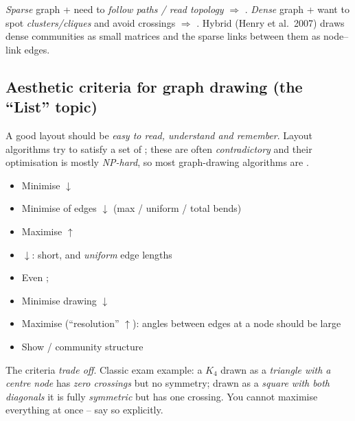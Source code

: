 \begin{keybox}
\emph{Sparse} graph + need to \emph{follow paths / read topology} $\Rightarrow$
. \emph{Dense} graph + want to spot \emph{clusters/cliques} and
avoid crossings $\Rightarrow$ . Hybrid  (Henry et
al.\ 2007) draws dense communities as small matrices and the sparse links
between them as node--link edges.
\end{keybox}

\subsection{Aesthetic criteria for graph drawing (the ``List'' topic)}

A good layout should be \emph{easy to read, understand and remember}. Layout
algorithms try to satisfy a set of ; these are often
\emph{contradictory} and their optimisation is mostly \emph{NP-hard}, so most
graph-drawing algorithms are .

\begin{keybox}
\begin{itemize}[leftmargin=1.4em]
  \item Minimise  $\downarrow$
  \item Minimise  of edges $\downarrow$ (max / uniform / total bends)
  \item Maximise  $\uparrow$
  \item {} $\downarrow$: short, and \emph{uniform} edge lengths
  \item Even ; 
  \item Minimise drawing  $\downarrow$
  \item Maximise  (``resolution'' $\uparrow$): angles
  between edges at a node should be large
  \item Show  / community structure
\end{itemize}
\end{keybox}

\begin{pitfall}
The criteria \emph{trade off}. Classic exam example: a $K_4$ drawn as a
\emph{triangle with a centre node} has \emph{zero crossings} but no symmetry;
drawn as a \emph{square with both diagonals} it is fully \emph{symmetric} but has
one crossing. You cannot maximise everything at once -- say so explicitly.
\end{pitfall}

